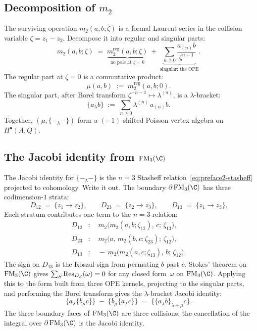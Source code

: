\subsection*{Decomposition of $m_2$}

The surviving operation $m_2(a,b;\zeta)$ is a formal Laurent
series in the collision variable $\zeta = z_1 - z_2$. Decompose
it into regular and singular parts:
\[
m_2(a,b;\zeta)
\;=\;
\underbrace{m_2^{\mathrm{reg}}(a,b;\zeta)}_{\text{no pole at }
\zeta = 0}
\;+\;
\underbrace{\sum_{n \ge 0}
\frac{a_{(n)}b}{\zeta^{n+1}}}_{\text{singular: the OPE}}.
\]
The regular part at $\zeta = 0$ is a commutative product:
\[
\mu(a,b) \;:=\; m_2^{\mathrm{reg}}(a,b;0).
\]
The singular part, after Borel transform
$\zeta^{-n-1} \mapsto \lambda^{(n)}$, is a $\lambda$-bracket:
\[
\{a_\lambda b\}
\;:=\;
\sum_{n \ge 0} \lambda^{(n)}\,a_{(n)}b.
\]
Together, $(\mu, \{-_\lambda-\})$ form a $(-1)$-shifted Poisson
vertex algebra on $H^\bullet(A, Q)$.

\subsection*{The Jacobi identity from $\FM_3(\C)$}

The Jacobi identity for $\{-_\lambda-\}$ is the $n = 3$ Stasheff
relation~\eqref{eq:preface2-stasheff} projected to cohomology.
Write it out. The boundary $\partial\FM_3(\C)$ has three
codimension-$1$ strata:
\[
D_{12} \;=\; \{z_1 \to z_2\}, \qquad
D_{23} \;=\; \{z_2 \to z_3\}, \qquad
D_{13} \;=\; \{z_1 \to z_3\}.
\]
Each stratum contributes one term to the $n = 3$ relation:
\begin{align*}
D_{12}&\colon\quad
m_2\bigl(m_2(a,b;\zeta_{12}),\, c;\, \zeta_{13}\bigr),
\\
D_{23}&\colon\quad
m_2\bigl(a,\, m_2(b,c;\zeta_{23});\, \zeta_{12}\bigr),
\\
D_{13}&\colon\quad
-\,m_2\bigl(m_2(a,c;\zeta_{13}),\, b;\, \zeta_{12}\bigr).
\end{align*}
The sign on $D_{13}$ is the Koszul sign from permuting $b$ past
$c$. Stokes' theorem on $\FM_3(\C)$ gives
$\sum_S \operatorname{Res}_{D_S}(\omega) = 0$ for any closed form~$\omega$ on
$\FM_3(\C)$. Applying this to the form built from three OPE
kernels, projecting to the singular parts, and performing the Borel
transform gives the $\lambda$-bracket Jacobi identity:
\[
\{a_\lambda \{b_\mu c\}\}
\;-\;
\{b_\mu \{a_\lambda c\}\}
\;=\;
\{\{a_\lambda b\}_{\lambda+\mu} c\}.
\]
The three boundary faces of $\FM_3(\C)$ are three collisions; the
cancellation of the integral over $\partial\FM_3(\C)$ is the Jacobi
identity.

